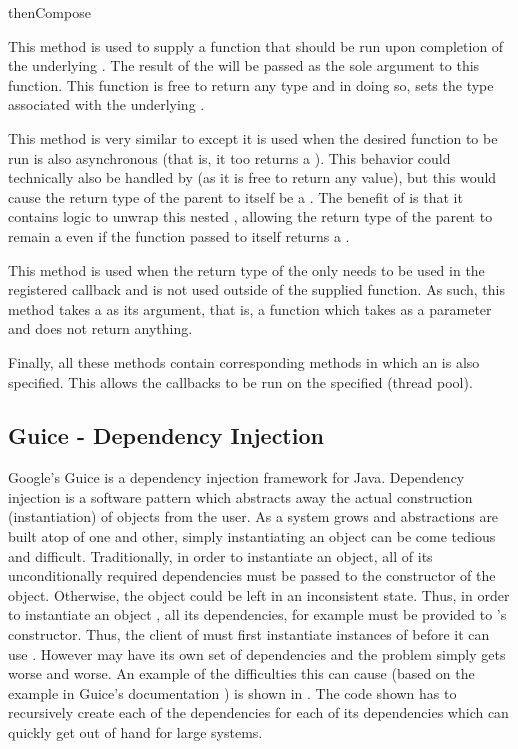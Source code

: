 \begin{labeling}{thenCompose}
	\item [thenApply] This method is used to supply a function that should be run upon completion of the underlying . The result of the  will be passed as the sole argument to this function. This function is free to return any type and in doing so, sets the type associated with the underlying . 
	\item [thenCompose] This method is very similar to  except it is used when the desired function to be run is also asynchronous (that is, it too returns a ). This behavior could technically also be handled by  (as it is free to return any value), but this would cause the return type of the parent  to itself be a . The benefit of  is that it contains logic to unwrap this nested , allowing the return type of the parent to remain a  even if the function passed to  itself returns a .
	\item [thenAccept] This method is used when the return type of the  only needs to be used in the registered callback and is not used outside of the supplied function. As such, this method takes a  as its argument, that is, a function which takes  as a parameter and does not return anything.  
\end{labeling}

Finally, all these methods contain corresponding methods in which an  is also specified. This allows the callbacks to be run on the specified  (thread pool).


\subsection{Guice - Dependency Injection}\label{sec:guice}
Google's Guice \cite{guice} is a dependency injection framework for Java. Dependency injection is a software pattern which abstracts away the actual construction (instantiation) of objects from the user. As a system grows and abstractions are built atop of one and other, simply instantiating an object can be come tedious and difficult. Traditionally, in order to instantiate an object, all of its unconditionally required dependencies must be passed to the constructor of the object. Otherwise, the object could be left in an inconsistent state. Thus, in order to instantiate an object , all its dependencies, for example  must be provided to 's constructor. Thus, the client of  must first instantiate instances of  before it can use . However  may have its own set of dependencies and the problem simply gets worse and worse. An example of the difficulties this can cause (based on the example in Guice's documentation \cite{guiceDocs}) is shown in . The code shown has to recursively create each of the dependencies for each of its dependencies which can quickly get out of hand for large systems.

